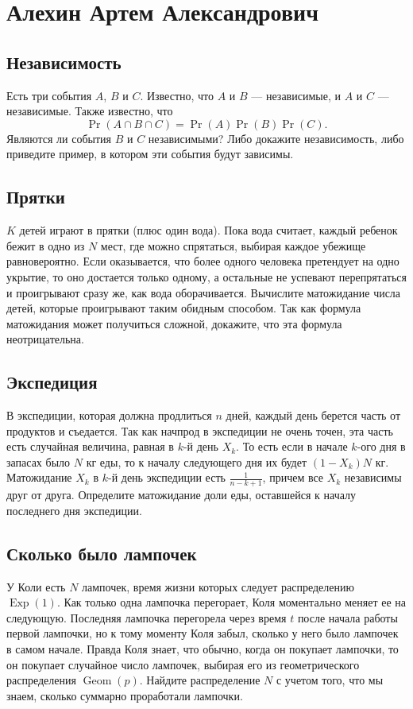 \documentclass[12pt]{article}
\DeclareMathOperator{\Geom}{Geom}
\DeclareMathOperator{\Exp}{Exp}
\begin{document}

\section{Алехин Артем Александрович}

\subsection{Независимость}
Есть три события $A$, $B$ и $C$. Известно, что $A$ и $B$ --- независимые, и $A$ и $C$ --- независимые. Также известно, что \[\Pr(A \cap B \cap C) = \Pr(A)\Pr(B)\Pr(C).\] Являются ли события $B$ и $C$ независимыми? Либо докажите независимость, либо приведите пример, в котором эти события будут зависимы.

\subsection{Прятки}
$K$ детей играют в прятки (плюс один вода). Пока вода считает, каждый ребенок бежит в одно из $N$ мест, где можно спрятаться, выбирая каждое убежище равновероятно. Если оказывается, что более одного человека претендует на одно укрытие, то оно достается только одному, а остальные не успевают перепрятаться и проигрывают сразу же, как вода оборачивается. Вычислите матожидание числа детей, которые проигрывают таким обидным способом. Так как формула матожидания может получиться сложной, докажите, что эта формула неотрицательна.

\subsection{Экспедиция}
В экспедиции, которая должна продлиться $n$ дней, каждый день берется часть от продуктов и съедается. Так как начпрод в экспедиции не очень точен, эта часть есть случайная величина, равная в $k$-й день $X_k$. То есть если в начале $k$-ого дня в запасах было $N$ кг еды, то к началу следующего дня их будет $(1 - X_k)N$ кг. Матожидание $X_k$ в $k$-й день экспедиции есть $\frac{1}{n - k + 1}$, причем все $X_k$ независимы друг от друга. Определите матожидание доли еды, оставшейся к началу последнего дня экспедиции.

\subsection{Сколько было лампочек}
У Коли есть $N$ лампочек, время жизни которых следует распределению $\Exp(1)$. Как только одна лампочка перегорает, Коля моментально меняет ее на следующую. Последняя лампочка перегорела через время $t$ после начала работы первой лампочки, но к тому моменту Коля забыл, сколько у него было лампочек в самом начале. Правда Коля знает, что обычно, когда он покупает лампочки, то он покупает случайное число лампочек, выбирая его из геометрического распределения $\Geom(p)$. Найдите распределение $N$ с учетом того, что мы знаем, сколько суммарно проработали лампочки. 
\end{document}
